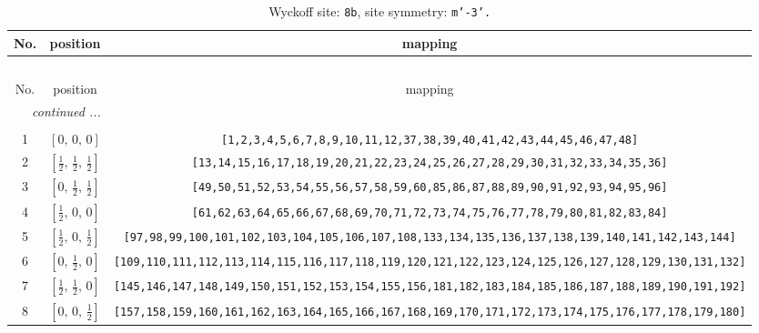 \documentclass[fleqn,8pt]{jsarticle}
\begin{document}
\renewcommand{\arraystretch}{1.2}
\begin{longtable}{ccc}
\caption{Wyckoff site: {\tt 8b}, site symmetry: {\tt m'-3'.}}
 \\
 \hline \hline
No. & position & mapping \\ \hline \endfirsthead

\multicolumn{2}{l}{\tablename\ \thetable{}} \\
 \hline \hline
No. & position & mapping \\ \hline \endhead

 \hline \hline
\multicolumn{2}{r}{\footnotesize\it continued ...} \\ \endfoot

 \hline \hline
\multicolumn{2}{r}{} \\ \endlastfoot

1 & $\left[ 0,\, 0,\, 0 \right]$ & {\tt [1,2,3,4,5,6,7,8,9,10,11,12,37,38,39,40,41,42,43,44,45,46,47,48]} \\ \hline
2 & $\left[ \frac{1}{2},\, \frac{1}{2},\, \frac{1}{2} \right]$ & {\tt [13,14,15,16,17,18,19,20,21,22,23,24,25,26,27,28,29,30,31,32,33,34,35,36]} \\ \hline
3 & $\left[ 0,\, \frac{1}{2},\, \frac{1}{2} \right]$ & {\tt [49,50,51,52,53,54,55,56,57,58,59,60,85,86,87,88,89,90,91,92,93,94,95,96]} \\ \hline
4 & $\left[ \frac{1}{2},\, 0,\, 0 \right]$ & {\tt [61,62,63,64,65,66,67,68,69,70,71,72,73,74,75,76,77,78,79,80,81,82,83,84]} \\ \hline
5 & $\left[ \frac{1}{2},\, 0,\, \frac{1}{2} \right]$ & {\tt [97,98,99,100,101,102,103,104,105,106,107,108,133,134,135,136,137,138,139,140,141,142,143,144]} \\ \hline
6 & $\left[ 0,\, \frac{1}{2},\, 0 \right]$ & {\tt [109,110,111,112,113,114,115,116,117,118,119,120,121,122,123,124,125,126,127,128,129,130,131,132]} \\ \hline
7 & $\left[ \frac{1}{2},\, \frac{1}{2},\, 0 \right]$ & {\tt [145,146,147,148,149,150,151,152,153,154,155,156,181,182,183,184,185,186,187,188,189,190,191,192]} \\ \hline
8 & $\left[ 0,\, 0,\, \frac{1}{2} \right]$ & {\tt [157,158,159,160,161,162,163,164,165,166,167,168,169,170,171,172,173,174,175,176,177,178,179,180]} \\
\end{longtable}
\renewcommand{\arraystretch}{1.2}
\end{document}
